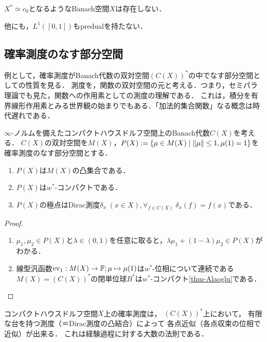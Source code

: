 \documentclass[uplatex,dvipdfmx]{jsreport}
\begin{document}
\begin{corollary}\label{cor-predual-of-c0}
    $X^*\simeq c_0$となるようなBanach空間$X$は存在しない．
\end{corollary}
\begin{remark}
    他にも，$L^1([0,1])$もpredualを持たない．
\end{remark}

\subsection{確率測度のなす部分空間}

\begin{tcolorbox}[colframe=ForestGreen, colback=ForestGreen!10!white,breakable,colbacktitle=ForestGreen!40!white,coltitle=black,fonttitle=\bfseries\sffamily,
title=]
    例として，確率測度がBanach代数の双対空間$(C(X))^*$の中でなす部分空間としての性質を見る．
    測度を，関数の双対空間の元と考える．つまり，セミパラ理論でも見た，関数への作用素としての測度の理解である．
    これは，積分を有界線形作用素とみる世界観の始まりでもある．「加法的集合関数」なる概念は時代遅れである．
\end{tcolorbox}

\begin{proposition}
    $\infty$-ノルムを備えたコンパクトハウスドルフ空間上のBanach代数$C(X)$を考える．
    $C(X)$の双対空間を$M(X)$，$P(X):=\left\{\mu\in M(X)\mid\|\mu\|\le 1,\mu(1)=1\right\}$を確率測度のなす部分空間とする．
    \begin{enumerate}
        \item $P(X)$は$M(X)$の凸集合である．
        \item $P(X)$は$w^*$-コンパクトである．
        \item $P(X)$の極点はDirac測度$\delta_x\;(x\in X),\forall_{f\in C(X)}\;\delta_x(f)=f(x)$である．
    \end{enumerate}
\end{proposition}
\begin{proof}\mbox{}
    \begin{enumerate}
        \item $\mu_1,\mu_2\in P(X)$と$\lambda\in(0,1)$を任意に取ると，$\lambda\mu_1+(1-\lambda)\mu_2\in P(X)$がわかる．
        \item 線型汎函数$\mathrm{ev}_1:M(X)\to\mathbb{F};\mu\mapsto\mu(1)$は$w^*$-位相について連続である
        $M(X)=(C(X))^*$の閉単位球$B^*$は$w^*$-コンパクト\ref{thm-Alaoglu}である．
    \end{enumerate}
\end{proof}
\begin{remarks}
    コンパクトハウスドルフ空間$X$上の確率測度は，
    $(C(X))^*$上において，
    有限な台を持つ測度（＝Dirac測度の凸結合）によって
    各点近似（各点収束の位相で近似）が出来る．
    これは経験過程に対する大数の法則である．
\end{remarks}
\end{document}
